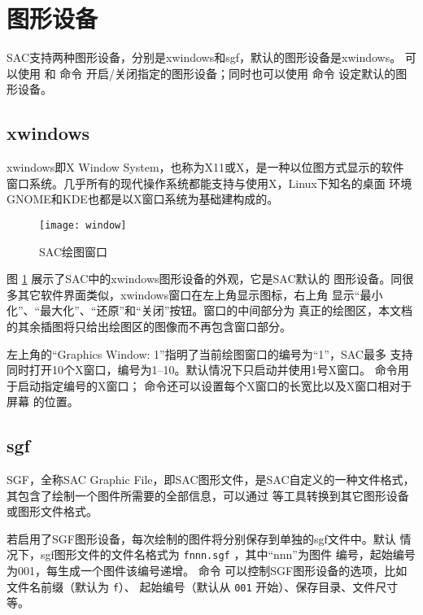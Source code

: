 \section{图形设备}
SAC支持两种图形设备，分别是xwindows和sgf，默认的图形设备是xwindows。
可以使用  和  命令
开启/关闭指定的图形设备；同时也可以使用  命令
设定默认的图形设备。

\subsection{xwindows}
xwindows即X Window System，也称为X11或X，是一种以位图方式显示的软件
窗口系统。几乎所有的现代操作系统都能支持与使用X，Linux下知名的桌面
环境GNOME和KDE也都是以X窗口系统为基础建构成的。

\begin{figure}[H]
\centering
\texttt{[image: window]}
\caption{SAC绘图窗口}
\label{fig:plot}
\end{figure}

图 \ref{fig:plot} 展示了SAC中的xwindows图形设备的外观，它是SAC默认的
图形设备。同很多其它软件界面类似，xwindows窗口在左上角显示图标，右上角
显示``最小化''、``最大化''、``还原''和``关闭''按钮。窗口的中间部分为
真正的绘图区，本文档的其余插图将只给出绘图区的图像而不再包含窗口部分。

左上角的``Graphics Window: 1''指明了当前绘图窗口的编号为``1''，SAC最多
支持同时打开10个X窗口，编号为1--10。默认情况下只启动并使用1号X窗口。
 命令用于启动指定编号的X窗口；
 命令还可以设置每个X窗口的长宽比以及X窗口相对于屏幕
的位置。

\subsection{sgf}
SGF，全称SAC Graphic File，即SAC图形文件，是SAC自定义的一种文件格式，
其包含了绘制一个图件所需要的全部信息，可以通过 
等工具转换到其它图形设备或图形文件格式。

若启用了SGF图形设备，每次绘制的图件将分别保存到单独的sgf文件中。默认
情况下，sgf图形文件的文件名格式为 \texttt{fnnn.sgf} ，其中``nnn''为图件
编号，起始编号为001，每生成一个图件该编号递增。 命令
可以控制SGF图形设备的选项，比如文件名前缀（默认为 \texttt{f}）、
起始编号（默认从 \texttt{001} 开始）、保存目录、文件尺寸等。
